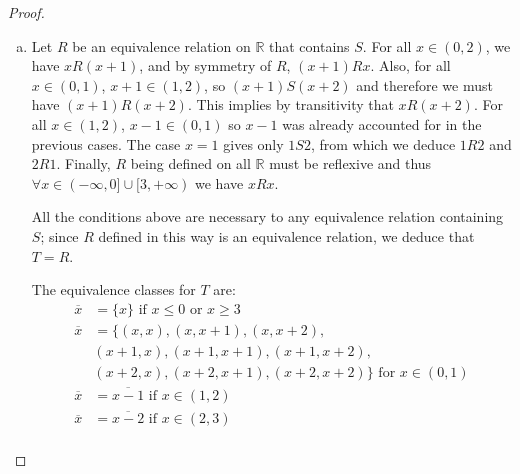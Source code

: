 \documentclass[11pt,a4paper,twoside]{article}
\theoremstyle{definition}
\begin{document}
\begin{proof}
\begin{enumerate}[(a)]
    \item Let $R$ be an equivalence relation on $\mathbb{R}$ that contains $S$. For all $x \in (0,2)$, we have $x R (x + 1)$, and by symmetry of $R$, $(x + 1) R x$.
      Also, for all $x \in (0,1)$, $x + 1 \in (1, 2)$, so $(x + 1) S (x + 2)$ and therefore we must have $(x + 1) R (x + 2)$. This implies by transitivity that $x R (x + 2)$.
      For all $x \in (1, 2)$, $x - 1 \in (0, 1)$ so $x - 1$ was already accounted for in the previous cases.
      The case $x = 1$ gives only $1 S 2$, from which we deduce $1 R 2$  and $2 R 1$.
      Finally, $R$ being defined on all $\mathbb{R}$ must be reflexive and thus $\forall x \in ({-\infty}, 0] \cup [3, {+\infty})$ we have $x R x$.

      All the conditions above are necessary to any equivalence relation containing $S$; since $R$ defined in this way is an equivalence relation, we deduce that $T = R$.

      The equivalence classes for $T$ are:
      \begin {align*}
        \overline{x} &= \{ x \} \text{ if } x \leq 0 \text{ or } x \geq 3 \\
        \overline{x} &= \{ (x, x), (x, x + 1), (x, x + 2), \\
        &(x + 1, x), (x + 1, x + 1), (x + 1, x + 2), \\
        &(x + 2, x), (x + 2, x + 1), (x + 2, x + 2) \} \text{ for } x \in (0, 1) \\
        \overline{x} &= \overline{x - 1} \text{ if } x \in (1, 2) \\
        \overline{x} &= \overline{x - 2} \text{ if } x \in (2, 3) \\
      \end{align*}

  \end{enumerate}

\end{proof}
\end{document}
